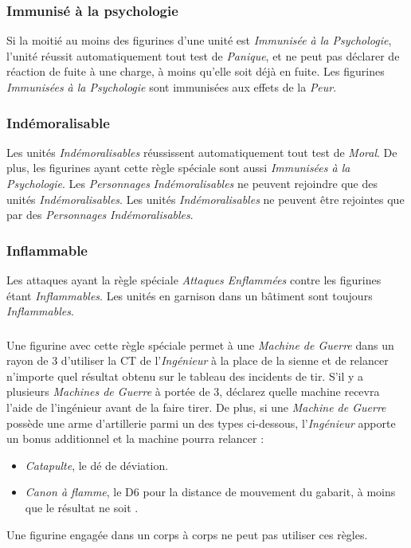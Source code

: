 \subsubsection*{Immunisé à la psychologie}

Si la moitié au moins des figurines d'une unité est \emph{Immunisée à la Psychologie}, l'unité réussit automatiquement tout test de \emph{Panique}, et ne peut pas déclarer de réaction de fuite à une charge, à moins qu'elle soit déjà en fuite. Les figurines \emph{Immunisées à la Psychologie} sont immunisées aux effets de la \emph{Peur}.

\subsubsection*{Indémoralisable}

Les unités \emph{Indémoralisables} réussissent automatiquement tout test de \emph{Moral}. De plus, les figurines ayant cette règle spéciale sont aussi \emph{Immunisées à la Psychologie}. Les \emph{Personnages} \emph{Indémoralisables} ne peuvent rejoindre que des unités \emph{Indémoralisables}. Les unités \emph{Indémoralisables} ne peuvent être rejointes que par des \emph{Personnages} \emph{Indémoralisables}.

\subsubsection*{Inflammable}

Les attaques ayant la règle spéciale \emph{Attaques Enflammées}  contre les figurines étant \emph{Inflammables}. Les unités en garnison dans un bâtiment sont toujours \emph{Inflammables}.

\subsubsection*{}

Une figurine avec cette règle spéciale permet à une \emph{Machine de Guerre} dans un rayon de 3{\pouce} d'utiliser la CT de l'\emph{Ingénieur} à la place de la sienne et de relancer n'importe quel résultat obtenu sur le tableau des incidents de tir. S'il y a plusieurs \emph{Machines de Guerre} à portée de 3{\pouce}, déclarez quelle machine recevra l'aide de l'ingénieur avant de la faire tirer. De plus, si une \emph{Machine de Guerre} possède une arme d'artillerie parmi un des types ci-dessous, l'\emph{Ingénieur} apporte un bonus additionnel et la machine pourra relancer :
\begin{itemize} [label={-}]
\item \emph{Catapulte}, le dé de déviation.
\item \emph{Canon à flamme}, le D6 pour la distance de mouvement du gabarit, à moins que le résultat ne soit .
\end{itemize}
Une figurine engagée dans un corps à corps ne peut pas utiliser ces règles.


